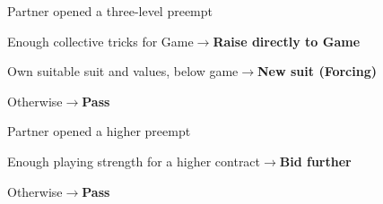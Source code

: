 \documentclass[10pt,letterpaper]{article}
\begin{document}
\begin{minipage}[t]{0.485\textwidth}\vspace{0pt}

\begin{guidecard}{Partner opened a three-level preempt}
\begin{branches}
\item Enough collective tricks for Game\;\ensuremath{\longrightarrow}\;\textbf{Raise directly to Game}
\item Own suitable suit and values, below game\;\ensuremath{\longrightarrow}\;\textbf{New suit (Forcing)}
\item Otherwise\;\ensuremath{\longrightarrow}\;\textbf{Pass}
\end{branches}
\end{guidecard}

\begin{guidecard}{Partner opened a higher preempt}
\begin{branches}
\item Enough playing strength for a higher contract\;\ensuremath{\longrightarrow}\;\textbf{Bid further}
\item Otherwise\;\ensuremath{\longrightarrow}\;\textbf{Pass}
\end{branches}
\end{guidecard}

\end{minipage}
\end{document}
